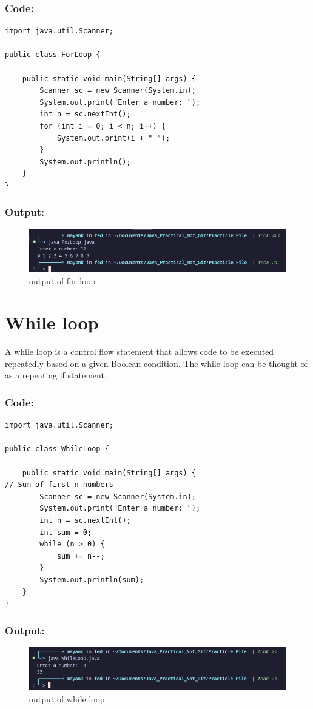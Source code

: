 \documentclass[a4paper,12pt]{article}
\begin{document}
\subsubsection{Code: }
\begin{lstlisting}
import java.util.Scanner;

public class ForLoop {

    public static void main(String[] args) {
        Scanner sc = new Scanner(System.in);
        System.out.print("Enter a number: ");
        int n = sc.nextInt();
        for (int i = 0; i < n; i++) {
            System.out.print(i + " ");
        }
        System.out.println();
    }
}
\end{lstlisting}
\subsubsection{Output: }
\begin{figure}[H]
    \centering
    \includegraphics[width=0.9\linewidth]{images/ForOut.png}
    \caption{output of for loop}
    \label{fig:sample_image}
\end{figure}

\section{While loop}
A while loop is a control flow statement that allows code to be executed repeatedly
based on a given Boolean condition. The while loop can be thought of as a repeating if
statement.
\subsubsection{Code: }
\begin{lstlisting}
import java.util.Scanner;

public class WhileLoop {

    public static void main(String[] args) {
// Sum of first n numbers
        Scanner sc = new Scanner(System.in);
        System.out.print("Enter a number: ");
        int n = sc.nextInt();
        int sum = 0;
        while (n > 0) {
            sum += n--;
        }
        System.out.println(sum);
    }
}
\end{lstlisting}
\subsubsection{Output: }
\begin{figure}[H]
    \centering
    \includegraphics[width=0.9\linewidth]{images/WhileOut.png}
    \caption{output of while loop}
    \label{fig:sample_image}
\end{figure}
\end{document}
